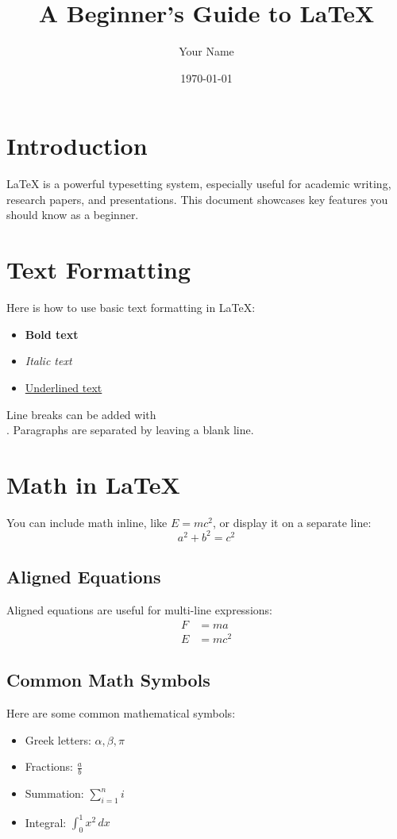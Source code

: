 \documentclass[a4paper, 12pt]{article}
\title{A Beginner's Guide to LaTeX}
\author{Your Name}
\date{\today}
\begin{document}
\maketitle

\tableofcontents  %
\newpage

\section{Introduction}
LaTeX is a powerful typesetting system, especially useful for academic writing, research papers, and presentations. This document showcases key features you should know as a beginner.

\section{Text Formatting}
Here is how to use basic text formatting in LaTeX:
\begin{itemize}
    \item \textbf{Bold text}
    \item \textit{Italic text}
    \item \underline{Underlined text}
\end{itemize}

Line breaks can be added with \texttt{\\}. Paragraphs are separated by leaving a blank line.

\section{Math in LaTeX}
You can include math inline, like $E = mc^2$, or display it on a separate line:
\[
a^2 + b^2 = c^2
\]

\subsection{Aligned Equations}
Aligned equations are useful for multi-line expressions:
\begin{align}
F &= ma \\
E &= mc^2
\end{align}

\subsection{Common Math Symbols}
Here are some common mathematical symbols:
\begin{itemize}
    \item Greek letters: $\alpha, \beta, \pi$
    \item Fractions: $\frac{a}{b}$
    \item Summation: $\sum_{i=1}^n i$
    \item Integral: $\int_0^1 x^2 \, dx$
\end{itemize}
\end{document}
